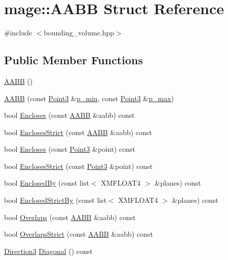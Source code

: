 \hypertarget{structmage_1_1_a_a_b_b}{}\section{mage\+:\+:A\+A\+BB Struct Reference}
\label{structmage_1_1_a_a_b_b}


{\ttfamily \#include $<$bounding\+\_\+volume.\+hpp$>$}

\subsection*{Public Member Functions}
\begin{DoxyCompactItemize}
\item 
\hyperlink{structmage_1_1_a_a_b_b_ae6db94dcb9165eb008f0be8741f0eb62}{A\+A\+BB} ()
\item 
\hyperlink{structmage_1_1_a_a_b_b_aff9e36907c435c74cc948a13cc9f1222}{A\+A\+BB} (const \hyperlink{structmage_1_1_point3}{Point3} \&\hyperlink{structmage_1_1_a_a_b_b_a600c62081fd3516c0be64bb81495cd1d}{p\+\_\+min}, const \hyperlink{structmage_1_1_point3}{Point3} \&\hyperlink{structmage_1_1_a_a_b_b_ad0a69206176c61ce9a71f2ddb0e5deb2}{p\+\_\+max})
\item 
bool \hyperlink{structmage_1_1_a_a_b_b_a0d6619404376bacf956b4a0c6662696f}{Encloses} (const \hyperlink{structmage_1_1_a_a_b_b}{A\+A\+BB} \&aabb) const
\item 
bool \hyperlink{structmage_1_1_a_a_b_b_a3bb59de6eca634cb3ddec4ad314fde21}{Encloses\+Strict} (const \hyperlink{structmage_1_1_a_a_b_b}{A\+A\+BB} \&aabb) const
\item 
bool \hyperlink{structmage_1_1_a_a_b_b_a67d1820b5ee787f02e6cfd593aca35fd}{Encloses} (const \hyperlink{structmage_1_1_point3}{Point3} \&point) const
\item 
bool \hyperlink{structmage_1_1_a_a_b_b_a436950a97b647179506bb42a3f2f2b34}{Encloses\+Strict} (const \hyperlink{structmage_1_1_point3}{Point3} \&point) const
\item 
bool \hyperlink{structmage_1_1_a_a_b_b_a7d4cd9138aa14aa79fba35a266634dac}{Enclosed\+By} (const list$<$ X\+M\+F\+L\+O\+A\+T4 $>$ \&planes) const
\item 
bool \hyperlink{structmage_1_1_a_a_b_b_a098cdfecc66ce8a1e557280aafda33e3}{Enclosed\+Strict\+By} (const list$<$ X\+M\+F\+L\+O\+A\+T4 $>$ \&planes) const
\item 
bool \hyperlink{structmage_1_1_a_a_b_b_a5a959edc3bc5ccdd29025d612c2e66e3}{Overlaps} (const \hyperlink{structmage_1_1_a_a_b_b}{A\+A\+BB} \&aabb) const
\item 
bool \hyperlink{structmage_1_1_a_a_b_b_ae8e6eca9c5e30015a91ab2e900594bfc}{Overlaps\+Strict} (const \hyperlink{structmage_1_1_a_a_b_b}{A\+A\+BB} \&aabb) const
\item 
\hyperlink{structmage_1_1_direction3}{Direction3} \hyperlink{structmage_1_1_a_a_b_b_a2f63dfb4e4296101897a5a3e2b8ad4bb}{Diagonal} () const
\end{DoxyCompactItemize}
